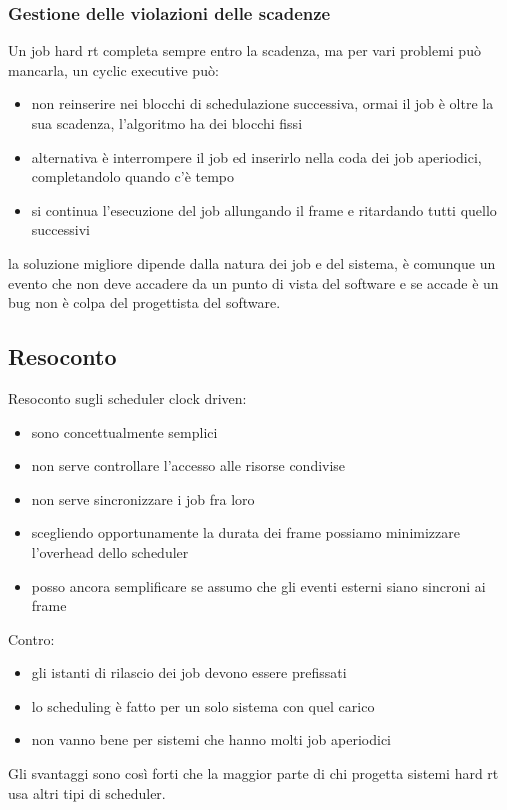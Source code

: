 \documentclass[12pt, oneside]{extbook}
\begin{document}
\subsubsection{Gestione delle violazioni delle scadenze}
Un job hard rt completa sempre entro la scadenza, ma per vari problemi può mancarla, un cyclic executive può:
\begin{itemize}
	\item non reinserire nei blocchi di schedulazione successiva, ormai il job è oltre la sua scadenza, l'algoritmo ha dei blocchi fissi
	\item alternativa è interrompere il job ed inserirlo nella coda dei job aperiodici, completandolo quando c'è tempo
	\item si continua l'esecuzione del job allungando il frame e ritardando tutti quello successivi
\end{itemize}
la soluzione migliore dipende dalla natura dei job e del sistema, è comunque un evento che non deve accadere da un punto di vista del software e se accade è un bug non è colpa del progettista del software.

\subsection{Resoconto}
Resoconto sugli scheduler clock driven:
\begin{itemize}
	\item sono concettualmente semplici
	\item non serve controllare l'accesso alle risorse condivise
	\item non serve sincronizzare i job fra loro
	\item scegliendo opportunamente la durata dei frame possiamo minimizzare l'overhead dello scheduler
	\item posso ancora semplificare se assumo che gli eventi esterni siano sincroni ai frame
\end{itemize}
Contro:
\begin{itemize}
	\item gli istanti di rilascio dei job devono essere prefissati
	\item lo scheduling è fatto per un solo sistema con quel carico
	\item non vanno bene per sistemi che hanno molti job aperiodici
\end{itemize}
Gli svantaggi sono così forti che la maggior parte di chi progetta sistemi hard rt usa altri tipi di scheduler.
\end{document}
